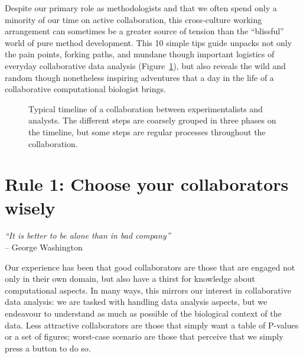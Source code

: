 \documentclass{article}
\begin{document}
Despite our primary role as methodologists and that we often spend only a minority of our time on active collaboration, this cross-culture working arrangement can sometimes be a greater source of tension than the ``blissful'' world of pure method development. This 10 simple tips guide unpacks not only the pain points, forking paths, and mundane though important logistics of everyday collaborative data analysis (Figure~\ref{fig:figure1}), but also reveals the wild and random though nonetheless inspiring adventures that a day in the life of a collaborative computational biologist brings.

\clearpage

\begin{figure}[h]
  \centering
  \caption{Typical timeline of a collaboration between experimentalists and analysts. The different steps are coarsely grouped in three phases on the timeline, but some steps are regular processes throughout the collaboration.}
  \label{fig:figure1}
\end{figure}

\section*{Rule 1: Choose your collaborators wisely} %
\label{rule1_choose}

\begin{flushright}
\rightskip=1cm\textit{``It is better to be alone than in bad company''} \\
\vspace{.2em}
\rightskip=0cm -- George Washington
\end{flushright}

Our experience has been that good collaborators are those that are engaged not only in their own domain, but also have a thirst for knowledge about computational aspects. In many ways, this mirrors our interest in collaborative data analysis: we are tasked with handling data analysis aspects, but we endeavour to understand as much as possible of the biological context of the data. Less attractive collaborators are those that simply want a table of P-values or a set of figures; worst-case scenario are those that perceive that we simply press a button to do so. 
\end{document}
